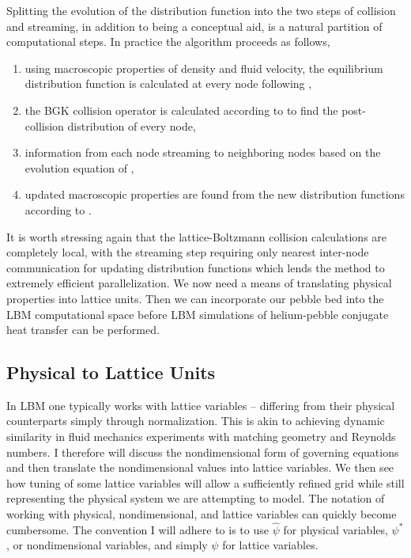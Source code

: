 Splitting the evolution of the distribution function into the two steps of collision and streaming, in addition to being a conceptual aid, is a natural partition of computational steps. In practice the algorithm proceeds as follows,\cite{Viggen2009}
\begin{enumerate}
	\item{using macroscopic properties of density and fluid velocity, the equilibrium distribution function is calculated at every node following ,}
	\item{the BGK collision operator is calculated according to  to find the post-collision distribution of every node,}
	\item{information from each node streaming to neighboring nodes based on the evolution equation of ,}
	\item{updated macroscopic properties are found from the new distribution functions according to .}
\end{enumerate}

It is worth stressing again that the lattice-Boltzmann collision calculations are completely local, with the streaming step requiring only nearest inter-node communication for updating distribution functions which lends the method to extremely efficient parallelization. We now need a means of translating physical properties into lattice units. Then we can incorporate our pebble bed into the LBM computational space before LBM simulations of helium-pebble conjugate heat transfer can be performed.





\subsection{Physical to Lattice Units}\label{sec:physical-to-lattice}
In LBM one typically works with lattice variables -- differing from their physical counterparts simply through normalization. This is akin to achieving dynamic similarity in fluid mechanics experiments with matching geometry and Reynolds numbers. I therefore will discuss the nondimensional form of governing equations and then translate the nondimensional values into lattice variables. We then see how tuning of some lattice variables will allow a sufficiently refined grid while still representing the physical system we are attempting to model. The notation of working with physical, nondimensional, and lattice variables can quickly become cumbersome. The convention I will adhere to is to use $\hat{\psi}$ for physical variables, $\psi^*$, or nondimensional variables, and simply $\psi$ for lattice variables.

